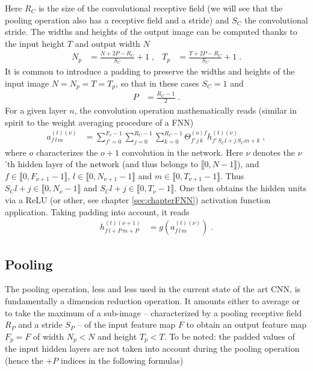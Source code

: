 Here $R_C$ is the size of the convolutional receptive field (we will see that the pooling operation also has a receptive field and a stride) and $S_C$ the convolutional stride. The widths and heights of the output image can be computed thanks to the input height $T$ and output width $N$
\begin{align}
N_p&=\frac{N+2P-R_C}{S_C}+1 \;,&
%
T_p&=\frac{T+2P-R_C}{S_C}+1\;.
\end{align}
It is common to introduce a padding to preserve the widths and heights of the input image $N=N_p=T=T_p$, so that in these cases $S_C=1$ and
\begin{align}
P&=\frac{R_C-1}{2}\;.
\end{align}
For a given layer $n$, the convolution operation mathematically reads (similar in spirit to the weight averaging procedure of a FNN)
\begin{align}
a_{f\,l\,m}^{(t)(\nu)}&=\sum^{F_\nu-1}_{f'=0}\sum^{R_C-1}_{j=0}\sum^{R_C-1}_{k=0}
%
\Theta^{(o)f}_{f'\,j\,k}h^{(t)(\nu)}_{f'\,S_Cl+j\,S_Cm+k}\;,
\end{align}
where $o$ characterizes the $o+1$ convolution in the network. Here $\nu$ denotes the $\nu$'th hidden layer of the network (and thus belongs to $\llbracket0,N-1 \rrbracket$), and $f\in\llbracket0,F_{\nu+1}-1\rrbracket$, $l\in\llbracket0,N_{\nu+1}-1 \rrbracket$ and $m\in\llbracket0,T_{\nu+1}-1 \rrbracket$. Thus $S_Cl+j\in\llbracket0,N_\nu-1 \rrbracket$ and $S_Cl+j\in\llbracket0,T_\nu-1 \rrbracket$. One then obtains the hidden units via a ReLU (or other, see chapter \ref{sec:chapterFNN}) activation function application. Taking padding into account, it reads
\begin{align}
h_{f\,l+P\,m+P}^{(t)(\nu+1)}&=g\left(a_{f\,l\,m}^{(t)(\nu)}\right)\;.
\end{align}


\subsection{Pooling}

The pooling operation, less and less used in the current state of the art CNN, is fundamentally a dimension reduction operation. It amounts either to average or to take the maximum of a sub-image -- characterized by a pooling receptive field $R_P$ and a stride $S_P$ -- of the input feature map $F$ to obtain an output feature map $F_p=F$ of width $N_p<N$ and height $T_p<T$. To be noted: the padded values of the input hidden layers are not taken into account during the pooling operation (hence the $+P$ indices in the following formulas)


